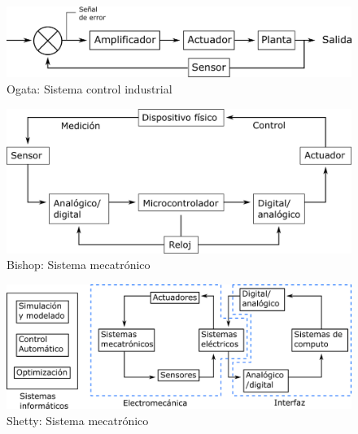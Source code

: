 \begin{figure}[h!]
    \centering
        \includegraphics[scale=0.32]{Proyecto Integrador Figuras/01 Ogata Sistema Control Industrial.png}
        \caption{Ogata: Sistema control industrial}
\end{figure}
    
\begin{figure}[h!]
    \centering
        \includegraphics[scale=0.27]{Proyecto Integrador Figuras/02 Bishop Sistema Mecatronico.png}
        \caption{Bishop: Sistema mecatrónico}
\end{figure}

\begin{figure}[h!]
    \centering
        \includegraphics[scale=0.27]{Proyecto Integrador Figuras/03 Shetty Sistema Mecatronico.png}
        \caption{Shetty: Sistema mecatrónico}
\end{figure}
